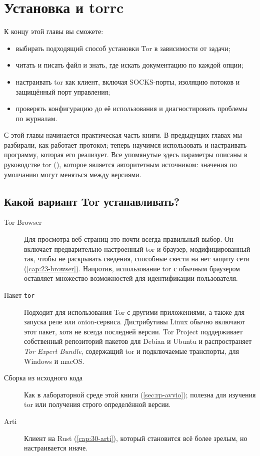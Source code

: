 \chapter{Установка и torrc}\label{cap:17-torrc}

\begin{obiettivi}
К концу этой главы вы сможете:
\begin{itemize}[nosep]
  \item выбирать подходящий способ установки Tor в зависимости от задачи;
  \item читать и писать файл  и знать, где искать документацию по каждой опции;
  \item настраивать tor как клиент, включая SOCKS-порты, изоляцию потоков и защищённый порт управления;
  \item проверять конфигурацию до её использования и диагностировать проблемы по журналам.
\end{itemize}
\end{obiettivi}

С этой главы начинается практическая часть книги. В предыдущих главах мы разбирали, как работает протокол; теперь научимся использовать и настраивать программу, которая его реализует. Все упомянутые здесь параметры описаны в руководстве tor (), которое является авторитетным источником: значения по умолчанию могут меняться между версиями.

\section{Какой вариант Tor устанавливать?}\label{sec:torrc-installare}

\begin{description}
  \item[Tor Browser] Для просмотра веб-страниц это почти всегда правильный выбор. Он включает предварительно настроенный tor и браузер, модифицированный так, чтобы не раскрывать сведения, способные свести на нет защиту сети (\cref{cap:23-browser}). Напротив, использование tor с обычным браузером оставляет множество возможностей для идентификации пользователя.
  \item[Пакет \texttt{tor}] Подходит для использования Tor с другими приложениями, а также для запуска реле или onion-сервиса. Дистрибутивы Linux обычно включают этот пакет, хотя не всегда последней версии. Tor Project поддерживает собственный репозиторий пакетов для Debian и Ubuntu и распространяет \emph{Tor Expert Bundle}, содержащий tor и подключаемые транспорты, для Windows и macOS.
  \item[Сборка из исходного кода] Как в лабораторной среде этой книги (\cref{sec:rp-avvio}); полезна для изучения tor или получения строго определённой версии.
  \item[Arti] Клиент на Rust (\cref{cap:30-arti}), который становится всё более зрелым, но настраивается иначе.
\end{description}

